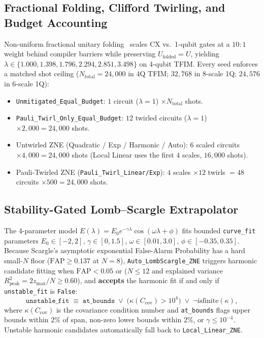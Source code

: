 \documentclass[10pt,twocolumn,a4paper]{article}
\begin{document}
\subsection{Fractional Folding, Clifford Twirling, and Budget Accounting}
Non-uniform fractional unitary folding~\cite{giurgica2020} scales $\mathrm{CX}$ vs.\ 1-qubit gates at a $10:1$ weight behind compiler barriers while preserving $U_{\mathrm{folded}} = U$, yielding $\lambda \in \{1.000, 1.398, 1.796, 2.294, 2.851, 3.498\}$ on 4-qubit TFIM. Every seed enforces a matched shot ceiling ($N_{\mathrm{total}} = 24{,}000$ in 4Q TFIM; $32{,}768$ in 8-scale 1Q; $24{,}576$ in 6-scale 1Q):
\begin{itemize}
    \item \texttt{Unmitigated\_Equal\_Budget}: $1$ circuit ($\lambda=1$) $\times N_{\mathrm{total}}$ shots.
    \item \texttt{Pauli\_Twirl\_Only\_Equal\_Budget}: $12$ twirled circuits ($\lambda=1$) $\times 2{,}000 = 24{,}000$ shots.
    \item Untwirled ZNE (Quadratic / Exp / Harmonic / Auto): $6$ scaled circuits $\times 4{,}000 = 24{,}000$ shots (Local Linear uses the first $4$ scales, $16{,}000$ shots).
    \item Pauli-Twirled ZNE (\texttt{Pauli\_Twirl\_Linear/Exp}): $4$ scales $\times 12$ twirls $= 48$ circuits $\times 500 = 24{,}000$ shots.
\end{itemize}

\subsection{Stability-Gated Lomb--Scargle Extrapolator}
The 4-parameter model $E(\lambda) = E_0 e^{-\gamma \lambda}\cos(\omega \lambda + \phi)$ fits bounded \texttt{curve\_fit} parameters $E_0 \in [-2,2]$, $\gamma \in [0, 1.5]$, $\omega \in [0.01, 3.0]$, $\phi \in [-0.35, 0.35]$. Because Scargle's asymptotic exponential False-Alarm Probability has a hard small-$N$ floor ($\mathrm{FAP} \ge 0.137$ at $N=8$), \texttt{Auto\_LombScargle\_ZNE} triggers harmonic candidate fitting when $\mathrm{FAP} < 0.05$ or ($N \le 12$ and explained variance $R^2_{\mathrm{peak}} = 2 z_{\max}/N \ge 0.60$), and \textbf{accepts} the harmonic fit if and only if \texttt{unstable\_fit} is \texttt{False}:
\begin{equation}
\texttt{unstable\_fit} \;\equiv\; \texttt{at\_bounds} \;\lor\; \big(\kappa(C_{\mathrm{cov}}) > 10^4\big) \;\lor\; \neg\mathrm{isfinite}(\kappa),
\end{equation}
where $\kappa(C_{\mathrm{cov}})$ is the covariance condition number and \texttt{at\_bounds} flags upper bounds within $2\%$ of span, non-zero lower bounds within $2\%$, or $\gamma \le 10^{-4}$. Unstable harmonic candidates automatically fall back to \texttt{Local\_Linear\_ZNE}.
\end{document}
